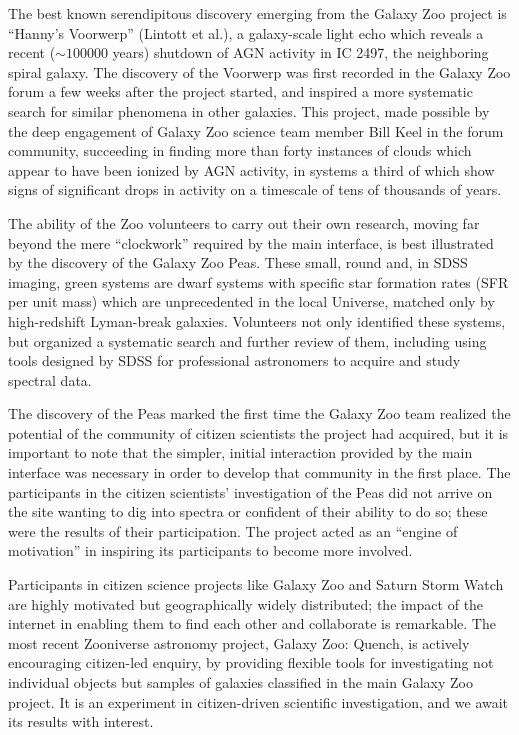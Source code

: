 \documentclass{ar2e}
\begin{document}
 The best known serendipitous discovery
emerging from the Galaxy Zoo project is ``Hanny's Voorwerp'' (Lintott et al.), a
galaxy-scale light echo which reveals a recent ($\sim 100000$ years) shutdown of
AGN activity in IC 2497, the neighboring spiral galaxy. The discovery of the
Voorwerp was first recorded in the Galaxy Zoo forum a few weeks after the
project started, and inspired a more systematic search for similar phenomena in
other galaxies. This project, made possible by the deep engagement of Galaxy Zoo
science team member Bill Keel in the forum community, succeeding in finding more
than forty instances of clouds which appear to have been ionized by AGN
activity, in systems a third of which show signs of significant drops in
activity on a timescale of tens of thousands of years. 

The ability of the Zoo volunteers to carry out their own research, moving far
beyond the mere ``clockwork'' required by the main interface, is best
illustrated by the discovery of the Galaxy Zoo Peas. These small, round and, in
SDSS imaging, green systems are dwarf systems with specific star formation rates
(SFR per unit mass) which are unprecedented in the local Universe, matched only
by high-redshift Lyman-break galaxies. Volunteers not only identified these
systems, but organized a systematic search and further review of them, including
using tools designed by SDSS for professional astronomers to acquire and study
spectral data. 

The discovery of the Peas marked the first time the Galaxy Zoo team realized the
potential of the community of citizen scientists the project had acquired, but
it is important to note that the simpler, initial interaction provided by the
main interface was necessary in order to develop that community in the first
place. The participants in the citizen scientists' investigation of the Peas did
not arrive on the site wanting to dig into spectra or confident of their ability
to do so; these were the results of their participation. The project  acted as
an ``engine of motivation'' in inspiring its participants to become more
involved. 


Participants in citizen science projects like Galaxy Zoo and Saturn Storm Watch 
are highly motivated but geographically widely distributed; the impact of the
internet in enabling them to find each other and collaborate is remarkable. The
most recent Zooniverse astronomy project, Galaxy Zoo: Quench, is actively
encouraging citizen-led enquiry, by providing flexible tools for investigating
not individual objects but samples of galaxies classified in the main Galaxy Zoo
project. It is an experiment in citizen-driven scientific investigation, and we
await its results with interest.
\end{document}
